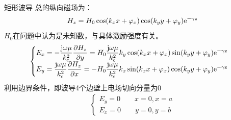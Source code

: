 \begin{frame}{矩形波导}
    总的纵向磁场为：
    \begin{align}
        H_z=H_0\cos(k_x x+\varphi_x)\cos(k_y y+\varphi_y)\rm{e}^{-\gamma z}
    \end{align}
    $H_0$在问题中认为是未知数，与具体激励强度有关。
    \begin{align*}
        \begin{cases}
            E_x = -\dfrac{\rm{j}\omega\mu}{k_c^2}\dfrac{\partial H_z}{\partial y}=H_0\dfrac{\rm{j}\omega\mu}{k_c^2}k_y\cos(k_x x+\varphi_x)\sin(k_y y+\varphi_y)\rm{e}^{-\gamma z} \\
            E_y = \dfrac{\rm{j}\omega\mu}{k_c^2}\dfrac{\partial H_z}{\partial x}=-H_0\dfrac{\rm{j}\omega\mu}{k_c^2}k_x\sin(k_x x+\varphi_x)\cos(k_y y+\varphi_y)\rm{e}^{-\gamma z}
        \end{cases}
    \end{align*}
    利用边界条件，即波导4个边壁上电场切向分量为0
    \begin{align*}
        \begin{cases}
            E_y = 0 \qquad x=0,x=a \\
            E_x = 0 \qquad y=0,y=b
        \end{cases}
    \end{align*}
\end{frame}

